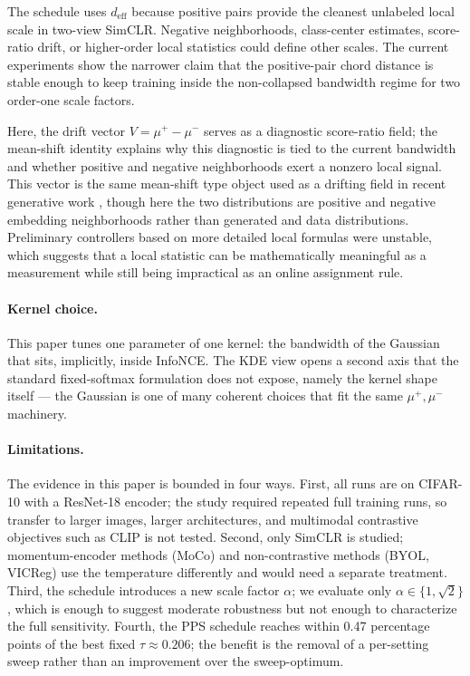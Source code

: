 \documentclass{article}
\begin{document}
The schedule uses $d_{\mathrm{eff}}$ because positive pairs provide the cleanest unlabeled local scale in two-view SimCLR. Negative neighborhoods, class-center estimates, score-ratio drift, or higher-order local statistics could define other scales. The current experiments show the narrower claim that the positive-pair chord distance is stable enough to keep training inside the non-collapsed bandwidth regime for two order-one scale factors.

Here, the drift vector $V=\mu^+-\mu^-$ serves as a diagnostic score-ratio field; the mean-shift identity explains why this diagnostic is tied to the current bandwidth and whether positive and negative neighborhoods exert a nonzero local signal. This vector is the same mean-shift type object used as a drifting field in recent generative work \citep{deng2026drifting,turan2026generative}, though here the two distributions are positive and negative embedding neighborhoods rather than generated and data distributions. Preliminary controllers based on more detailed local formulas were unstable, which suggests that a local statistic can be mathematically meaningful as a measurement while still being impractical as an online assignment rule.

\paragraph{Kernel choice.}
This paper tunes one parameter of one kernel: the bandwidth of the Gaussian that sits, implicitly, inside InfoNCE. The KDE view opens a second axis that the standard fixed-softmax formulation does not expose, namely the kernel shape itself — the Gaussian is one of many coherent choices that fit the same $\mu^+,\mu^-$ machinery.

\paragraph{Limitations.}
The evidence in this paper is bounded in four ways. First, all runs are on CIFAR-10 with a ResNet-18 encoder; the study required repeated full training runs, so transfer to larger images, larger architectures, and multimodal contrastive objectives such as CLIP is not tested. Second, only SimCLR is studied; momentum-encoder methods (MoCo) and non-contrastive methods (BYOL, VICReg) use the temperature differently and would need a separate treatment. Third, the schedule introduces a new scale factor $\alpha$; we evaluate only $\alpha\in\{1,\sqrt{2}\}$, which is enough to suggest moderate robustness but not enough to characterize the full sensitivity. Fourth, the PPS schedule reaches within 0.47 percentage points of the best fixed $\tau\approx0.206$; the benefit is the removal of a per-setting sweep rather than an improvement over the sweep-optimum.
\end{document}
